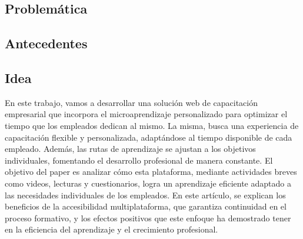 






\subsection{Problemática}


\subsection{Antecedentes}


\subsection{Idea}
En este trabajo, vamos a desarrollar una solución web de capacitación empresarial que incorpora el microaprendizaje
personalizado para optimizar el tiempo que los empleados dedican al mismo.
La misma, busca una experiencia de capacitación flexible y personalizada, adaptándose al tiempo disponible de cada empleado.
Además, las rutas de aprendizaje se ajustan a los objetivos individuales, fomentando el desarrollo profesional de manera constante.
El objetivo del paper es analizar cómo esta plataforma, mediante actividades breves como videos, lecturas y cuestionarios,
logra un aprendizaje eficiente adaptado a las necesidades individuales de los empleados.
En este artículo, se explican los beneficios de la accesibilidad multiplataforma, que garantiza continuidad en el proceso formativo,
y los efectos positivos que este enfoque ha demostrado tener en la eficiencia del aprendizaje y el crecimiento profesional.

